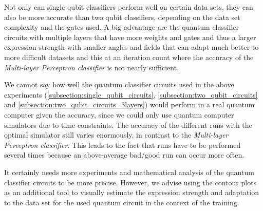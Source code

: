 Not only can single qubit classifiers perform well on certain data sets, they can also be more accurate than two qubit classifiers, depending on the data set complexity and the gates used. A big advantage are the quantum classifier circuits with multiple layers that have more weights and gates and thus a larger expression strength with smaller angles and fields that can adapt much better to more difficult datasets and this at an iteration count where the accuracy of the \textit{Multi-layer Perceptron classifier} is not nearly sufficient.

We cannot say how well the quantum classifier circuits used in the above experiments (\ref{subsection:single_qubit_circuits}, \ref{subsection:two_qubit_circuits} and \ref{subsection:two_qubit_circuits_3layers}) would perform in a real quantum computer given the accuracy, since we could only use quantum computer simulators due to time constraints. The accuracy of the different runs with the optimal simulator still varies enormously, in contrast to the \textit{Multi-layer Perceptron classifier}. This leads to the fact that runs have to be performed several times because an above-average bad/good run can occur more often.

It certainly needs more experiments and mathematical analysis of the quantum classifier circuits to be more precise. However, we advise using the contour plots as an additional tool to visually estimate the expression strength and adaptation to the data set for the used quantum circuit in the context of the training.
